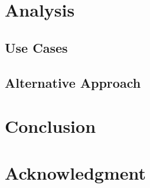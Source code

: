\section{Analysis}
\subsection{Use Cases}
\subsection{Alternative Approach}
\section{Conclusion}
\section{Acknowledgment}
